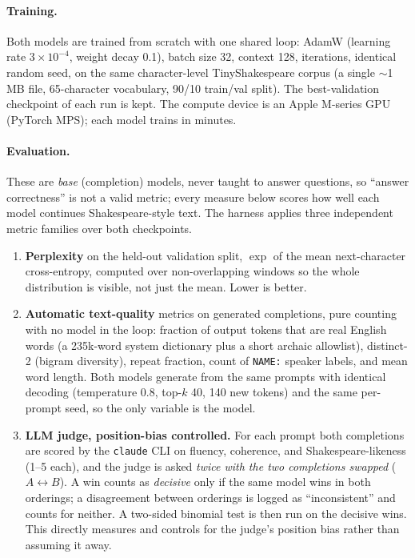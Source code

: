 \documentclass[11pt]{article}
\begin{document}
\paragraph{Training.} Both models are trained from scratch with one shared loop:
AdamW (learning rate $3\times10^{-4}$, weight decay 0.1), batch size 32, context
128, \NIters{} iterations, identical random seed, on the same character-level
TinyShakespeare corpus (a single $\sim$1\,MB file, 65-character vocabulary,
90/10 train/val split). The best-validation checkpoint of each run is kept. The
compute device is an Apple M-series GPU (PyTorch MPS); each model trains in
minutes.

\paragraph{Evaluation.} These are \emph{base} (completion) models, never taught
to answer questions, so ``answer correctness'' is not a valid metric; every
measure below scores how well each model continues Shakespeare-style text. The
harness applies three independent metric families over both checkpoints.

\begin{enumerate}
\item \textbf{Perplexity} on the held-out validation split, $\exp$ of the mean
  next-character cross-entropy, computed over \NWindows{} non-overlapping
  windows so the whole distribution is visible, not just the mean. Lower is
  better.
\item \textbf{Automatic text-quality} metrics on generated completions, pure
  counting with no model in the loop: fraction of output tokens that are real
  English words (a 235k-word system dictionary plus a short archaic allowlist),
  distinct-2 (bigram diversity), repeat fraction, count of \texttt{NAME:}
  speaker labels, and mean word length. Both models generate from the same
  \NPrompts{} prompts with identical decoding (temperature 0.8, top-$k$ 40, 140
  new tokens) and the same per-prompt seed, so the only variable is the model.
\item \textbf{LLM judge, position-bias controlled.} For each prompt both
  completions are scored by the \texttt{claude} CLI on fluency, coherence, and
  Shakespeare-likeness (1--5 each), and the judge is asked \emph{twice with the
  two completions swapped} ($A\leftrightarrow B$). A win counts as
  \emph{decisive} only if the same model wins in both orderings; a disagreement
  between orderings is logged as ``inconsistent'' and counts for neither. A
  two-sided binomial test is then run on the decisive wins. This directly
  measures and controls for the judge's position bias rather than assuming it
  away.
\end{enumerate}
\end{document}
